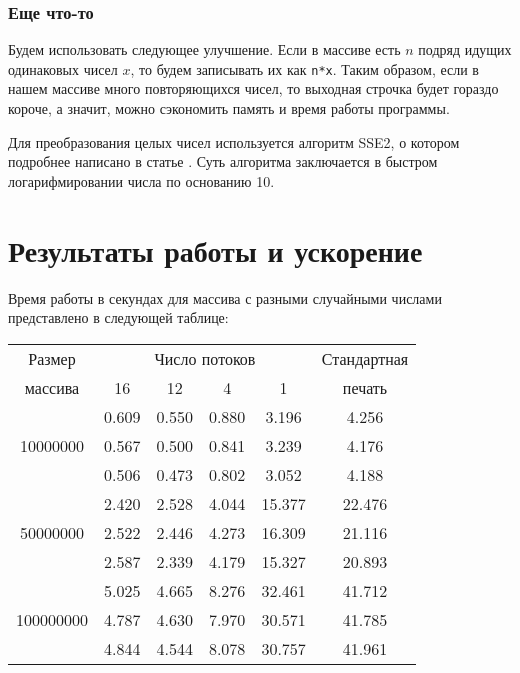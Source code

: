 \documentclass[a4paper, 12pt, twoside]{article}
\begin{document}
\subsubsection{Еще что-то}
Будем использовать следующее улучшение.
Если в массиве есть $n$ подряд идущих одинаковых чисел $x$, то будем записывать их как \texttt{n*x}.
Таким образом, если в нашем массиве много повторяющихся чисел, то выходная строчка будет гораздо короче, а значит, можно сэкономить память и время работы программы.

Для преобразования целых чисел используется алгоритм \textsf{SSE2}, о котором подробнее написано в статье \cite{2}.
Суть алгоритма заключается в быстром логарифмировании числа по основанию 10.

\section{Результаты работы и ускорение}
Время работы в секундах для массива с разными случайными числами представлено в следующей таблице:
\begin{center}
\begin{tabular}{||c|c|c|c|c|c||}
\hline
\hline
Размер & \multicolumn{4}{c|}{Число потоков} & Стандартная\\
\hhline{~|-|-|-|-|~|}
массива & 16 & 12 & 4 & 1 & печать \\
\hline
\hline
& 0.609 & 0.550 & 0.880 & 3.196 & 4.256 \\
\hhline{~|-|-|-|-|-|}
10000000 & 0.567 & 0.500 & 0.841 & 3.239 & 4.176 \\
\hhline{~|-|-|-|-|-|}
& 0.506 &0.473 & 0.802 & 3.052 & 4.188 \\
\hline
& 2.420 & 2.528 & 4.044 & 15.377 & 22.476 \\
\hhline{~|-|-|-|-|-|}
50000000 & 2.522 & 2.446 & 4.273 & 16.309 & 21.116\\
\hhline{~|-|-|-|-|-|}
& 2.587 & 2.339 & 4.179 & 15.327 & 20.893 \\
\hline
& 5.025 & 4.665 & 8.276 & 32.461 & 41.712 \\
\hhline{~|-|-|-|-|-|}
100000000 & 4.787 & 4.630 & 7.970 & 30.571 & 41.785 \\
\hhline{~|-|-|-|-|-|}
& 4.844 & 4.544 & 8.078 & 30.757 & 41.961 \\
\hline
\hline
\end{tabular}
\end{center}
\end{document}

